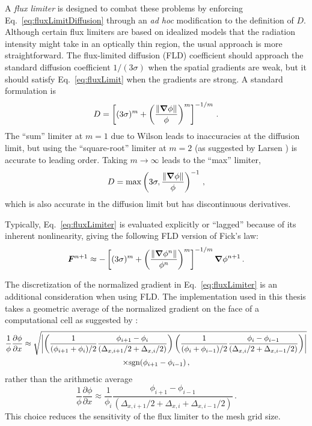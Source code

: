 A \emph{flux limiter} is designed to combat these problems by enforcing
Eq.~\eqref{eq:fluxLimitDiffusion} through an \emph{ad hoc} modification to
the definition of $D$.
Although certain flux limiters \cite{Lev1984} are based on
idealized models that the radiation intensity might take in an optically thin
region, the usual approach is more
straightforward. The flux-limited diffusion (FLD) coefficient should approach the
standard diffusion coefficient $1/(3\sigma)$ when the spatial gradients are weak,
but it should satisfy Eq.~\eqref{eq:fluxLimit} when the gradients are strong.
A standard formulation \cite{Ols2000} is
\begin{equation} \label{eq:fluxLimiter}
  D = \left[ (3\sigma)^{m} + \left( \frac{\left\| \bm{\nabla}
  \phi \right\|}{\phi} \right)^{m}\right]^{-1/m} \,.
\end{equation}
The ``sum'' limiter at $m=1$ due to Wilson \cite{Mor2000} leads to inaccuracies
at the diffusion limit, but using the ``square-root'' limiter at $m=2$ (as
suggested by Larsen \cite{Ols2000}) is accurate to leading order. Taking
$m\to\infty$ leads to the ``max'' limiter,
\begin{equation} \label{eq:fluxLimiterMax}
  D = \max\left( 3\sigma, \frac{\left\| \bm{\nabla} \phi \right\|}{\phi}
  \right)^{-1}\,,
\end{equation}
which is also accurate in the
diffusion limit but has discontinuous derivatives.

Typically, Eq.~\eqref{eq:fluxLimiter} is evaluated explicitly or ``lagged''
because of its inherent nonlinearity, giving the following FLD version of Fick's
law:
\begin{equation*}
  \bm{F}^{n+1} \approx - \left[ (3\sigma)^{m} + \left( \frac{\left\| \bm{\nabla}
  \phi^{n} \right\|}{\phi^{n}} \right)^{m}\right]^{-1/m} \bm{\nabla} \phi^{n+1} \,.
\end{equation*}

The discretization of the normalized gradient in Eq.~\eqref{eq:fluxLimiter}
is an additional consideration when using FLD. The implementation
used in this thesis takes a geometric average of the normalized gradient on the
face of a computational cell as suggested by \cite{Ols2007}:
\begin{multline*}
 \frac{1}{\phi} \frac{\partial \phi}{\partial x}
  \approx
\sqrt{\left|  \left(  \frac{1}{(\phi_{i+1} + \phi_{i})/2} \frac{\phi_{i+1} - \phi_{i}}
 { (\Delta_{x,i+1}/2 + \Delta_{x,i}/2)} \right)
\left(  \frac{1}{(\phi_{i} + \phi_{i-1})/2} \frac{\phi_{i} - \phi_{i-1}}
{ (\Delta_{x,i}/2 + \Delta_{x,i-1}/2)} \right)  \right|}
\\
\times
 \mathrm{sgn}(\phi_{i+1} - \phi_{i-1})\,,
\end{multline*}
rather than the arithmetic average
\begin{equation*}
 \frac{1}{\phi} \frac{\partial \phi}{\partial x}
  \approx
 \frac{1}{\phi_{i}} \frac{\phi_{i+1} - \phi_{i-1}}
 { (\Delta_{x,i+1}/2 + \Delta_{x,i} + \Delta_{x,i-1}/2)}\,.
\end{equation*}
This choice reduces the sensitivity of the flux limiter to the mesh grid size.

